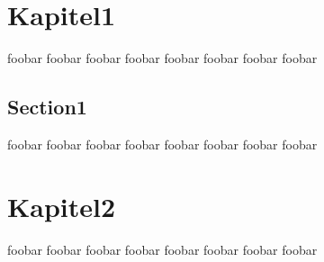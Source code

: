 \section{Kapitel1}
\label{cha:Kapitel1}
foobar foobar foobar foobar foobar foobar foobar foobar
\subsection{Section1}
\label{cha:Section1}
foobar foobar foobar foobar foobar foobar foobar foobar
\section{Kapitel2}
foobar foobar foobar foobar foobar foobar foobar foobar
